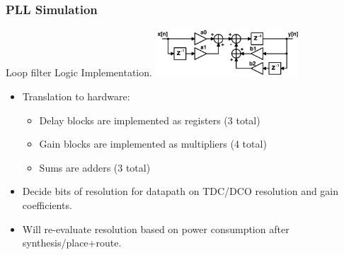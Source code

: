 \documentclass[t, screen, aspectratio=43]{beamer}
\begin{document}
\begin{frame}
	\frametitle{PLL Simulation}
	\begin{block}{Loop filter Logic Implementation.}
		\center\includegraphics[width=0.4\textwidth, angle=0]{discrete_filter2.pdf}
		\begin{itemize}
			\scriptsize
			\item Translation to hardware:
			\begin{itemize}
				\scriptsize
				\item Delay blocks are implemented as registers (3 total)
				\item Gain blocks are implemented as multipliers (4 total)
				\item Sums are adders (3 total)
			\end{itemize}
			\item Decide bits of resolution for datapath on TDC/DCO resolution and gain coefficients.
			\item Will re-evaluate resolution based on power consumption after synthesis/place+route. 
		\end{itemize} 	
	\end{block}
\end{frame}
\end{document}
